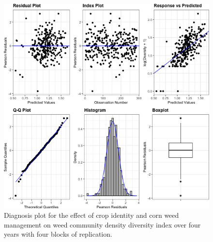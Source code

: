 \documentclass[
]{article}
\begin{document}
\begin{figure}
\centering
\includegraphics{AppendixA-model-diagnosis_files/figure-latex/dens-div-mod-1.png}
\caption{\label{fig:dens-div-mod}Diagnosis plot for the effect of crop identity and corn weed management on weed community density diversity index over four years with four blocks of replication.}
\end{figure}
\end{document}
